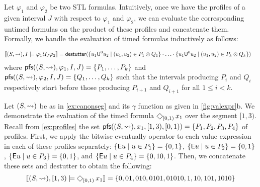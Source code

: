 Let $\varphi_1$ and $\varphi_2$ be two STL formulas.
Intuitively, once we have the profiles of a given interval $J$ with respect to $\varphi_1$ and $\varphi_2$, we can evaluate the corresponding untimed formulas on the product of these profiles and concatenate them.
Formally, we handle the evaluation of timed formulas inductively as follows:

\scriptsize
\begin{align*}
	\llbracket (S, {\hb}), I \models \varphi_1 \until_J \varphi_2 \rrbracket &= \destutter( \{ u_1 \mathsf{U}^0 u_2 \st (u_1, u_2) \in P_1 \otimes Q_1 \} \cdot \ldots \cdot \{ u_1 \mathsf{U}^0 u_2 \st (u_1, u_2) \in P_k \otimes Q_k \} )
\end{align*}
\normalsize
where $\mathsf{pfs}((S,{\rightsquigarrow}), \varphi_1, I, J) = \{P_1, \ldots, P_k \}$ and $\mathsf{pfs}((S,{\rightsquigarrow}), \varphi_2, I, J) = \{Q_1, \ldots, Q_k \}$ such that the intervals producing $P_i$ and $Q_i$ respectively start before those producing $P_{i+1}$ and $Q_{i+1}$ for all $1 \leq i < k$.



\begin{example} \label{ex:timed}
	Let $(S, {\rightsquigarrow})$ be as in \cref{ex:canonseg} and its $\gamma$ function as given in \cref{fig:valexpr}b.
	We demonstrate the evaluation of the timed formula $\LTLeventually_{[0,1)} x_1$ over the segment $[1,3)$.
	Recall from \cref{ex:profiles} the set $\mathsf{pfs}((S,{\rightsquigarrow}), x_1, [1,3), [0,1)) = \{P_1, P_2, P_3, P_4\}$ of profiles.
	First, we apply the bitwise eventually operator to each value expression in each of these profiles separately:
	$\{ \mathsf{E} u \st u \in P_1 \} = \{ 0, 1 \}$, $\{ \mathsf{E} u \st u \in P_2 \} = \{ 0, 1 \}$, $\{ \mathsf{E} u \st u \in P_3 \} = \{ 0, 1 \}$, and $\{ \mathsf{E} u \st u \in P_4 \} = \{ 0, 10, 1 \}$.
	Then, we concatenate these sets and destutter to obtain the following:
	\[ 	\llbracket (S, {\hb}), [1,3) \models \LTLeventually_{[0,1)} x_1 \rrbracket = \{ 0, 01, 010, 0101, 01010, 1, 10, 101, 1010 \}  \]
\end{example}


